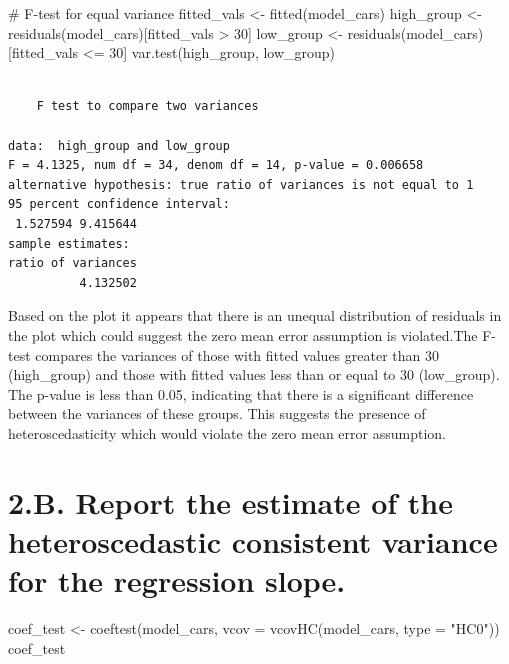\documentclass[
  letterpaper,
  DIV=11,
  numbers=noendperiod]{scrartcl}
\newenvironment{Shaded}{\begin{snugshade}}{\end{snugshade}}
\newcommand{\AttributeTok}[1]{\textcolor[rgb]{0.40,0.45,0.13}{#1}}
\newcommand{\CommentTok}[1]{\textcolor[rgb]{0.37,0.37,0.37}{#1}}
\newcommand{\DecValTok}[1]{\textcolor[rgb]{0.68,0.00,0.00}{#1}}
\newcommand{\FunctionTok}[1]{\textcolor[rgb]{0.28,0.35,0.67}{#1}}
\newcommand{\NormalTok}[1]{\textcolor[rgb]{0.00,0.23,0.31}{#1}}
\newcommand{\OtherTok}[1]{\textcolor[rgb]{0.00,0.23,0.31}{#1}}
\newcommand{\SpecialCharTok}[1]{\textcolor[rgb]{0.37,0.37,0.37}{#1}}
\newcommand{\StringTok}[1]{\textcolor[rgb]{0.13,0.47,0.30}{#1}}
\begin{document}
\begin{Shaded}
\begin{Highlighting}[]
\CommentTok{\# F{-}test for equal variance}
\NormalTok{fitted\_vals }\OtherTok{\textless{}{-}} \FunctionTok{fitted}\NormalTok{(model\_cars)}
\NormalTok{high\_group }\OtherTok{\textless{}{-}} \FunctionTok{residuals}\NormalTok{(model\_cars)[fitted\_vals }\SpecialCharTok{\textgreater{}} \DecValTok{30}\NormalTok{]}
\NormalTok{low\_group }\OtherTok{\textless{}{-}} \FunctionTok{residuals}\NormalTok{(model\_cars)[fitted\_vals }\SpecialCharTok{\textless{}=} \DecValTok{30}\NormalTok{]}
\FunctionTok{var.test}\NormalTok{(high\_group, low\_group)}
\end{Highlighting}
\end{Shaded}

\begin{verbatim}

    F test to compare two variances

data:  high_group and low_group
F = 4.1325, num df = 34, denom df = 14, p-value = 0.006658
alternative hypothesis: true ratio of variances is not equal to 1
95 percent confidence interval:
 1.527594 9.415644
sample estimates:
ratio of variances 
          4.132502 
\end{verbatim}

Based on the plot it appears that there is an unequal distribution of
residuals in the plot which could suggest the zero mean error assumption
is violated.The F-test compares the variances of those with fitted
values greater than 30 (high\_group) and those with fitted values less
than or equal to 30 (low\_group). The p-value is less than 0.05,
indicating that there is a significant difference between the variances
of these groups. This suggests the presence of heteroscedasticity which
would violate the zero mean error assumption.

\hypertarget{b.-report-the-estimate-of-the-heteroscedastic-consistent-variance-for-the-regression-slope.}{%
\section{2.B. Report the estimate of the heteroscedastic consistent
variance for the regression
slope.}\label{b.-report-the-estimate-of-the-heteroscedastic-consistent-variance-for-the-regression-slope.}}

\begin{Shaded}
\begin{Highlighting}[]
\NormalTok{coef\_test }\OtherTok{\textless{}{-}} \FunctionTok{coeftest}\NormalTok{(model\_cars, }\AttributeTok{vcov =} \FunctionTok{vcovHC}\NormalTok{(model\_cars, }\AttributeTok{type =} \StringTok{"HC0"}\NormalTok{))}
\NormalTok{coef\_test}
\end{Highlighting}
\end{Shaded}
\end{document}
